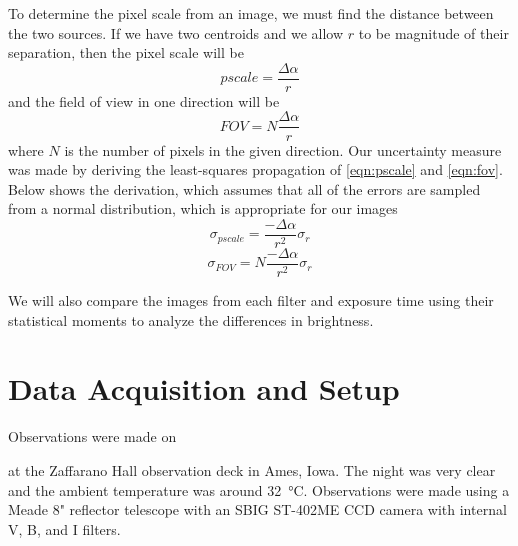 \documentclass[%
aip,
jmp,
reprint,
floatfix,
]{revtex4-1}
\begin{document}
	To determine the pixel scale from an image, we must find the distance between the two sources. If we have two centroids and we allow $r$ to be magnitude of their separation, then the pixel scale will be
	\begin{equation}
		pscale = \frac{\Delta\alpha}{r}
		\label{eqn:pscale}
	\end{equation}
	and the field of view in one direction will be 
	\begin{equation}
		FOV = N \frac{\Delta\alpha}{r}
		\label{eqn:fov}
	\end{equation}
	where $N$ is the number of pixels in the given direction. Our uncertainty measure was made by deriving the least-squares propagation of \autoref{eqn:pscale} and \autoref{eqn:fov}. Below shows the derivation, which assumes that all of the errors are sampled from a normal distribution, which is appropriate for our images
	\begin{equation}
	\sigma_{pscale} = \frac{-\Delta\alpha}{r^2} \sigma_r
	\label{egn:perror}
	\end{equation}
	\begin{equation}
		\sigma_{FOV} = N \frac{-\Delta\alpha}{r^2} \sigma_r
		\label{egn:ferror}
	\end{equation}
	
	We will also compare the images from each filter and exposure time using their statistical moments to analyze the differences in brightness.
	


	\section{Data Acquisition and Setup}
	Observations were made on \date{30 August 2017} at the Zaffarano Hall observation deck in Ames, Iowa. The night was very clear and the ambient temperature was around \SI{32}{\degreeCelsius}. Observations were made using a Meade 8" reflector telescope with an SBIG ST-402ME CCD camera with internal V, B, and I filters. 
	
\end{document}
